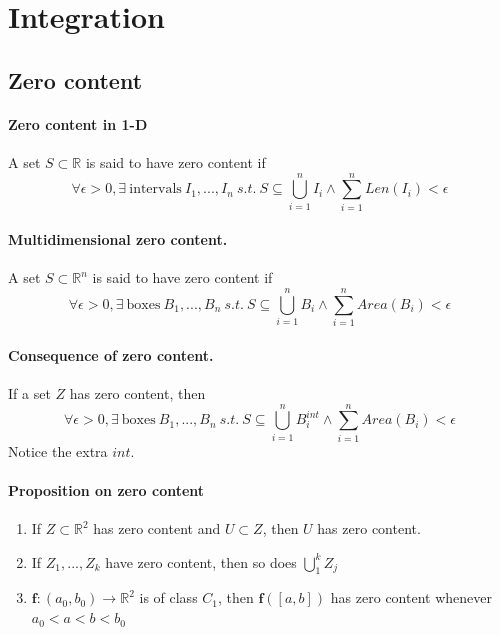 \documentclass[11pt]{article}
\newcommand{\real}[0]{\mathbb{R}}
\begin{document}
\section{Integration}
\subsection{Zero content}
\paragraph{Zero content in 1-D} A set $S\subset \real$ is said to have zero content if
\begin{equation*}
    \forall \epsilon > 0, \exists~\text{intervals}~I_1,...,I_n ~s.t.~ S\subseteq \bigcup_{i=1}^{n}I_i \wedge \sum_{i=1}^{n}{Len(I_i)} < \epsilon
\end{equation*}

\paragraph{Multidimensional zero content.} A set $S\subset \real^n$ is said to have zero content if
\begin{equation*}
    \forall \epsilon > 0, \exists~\text{boxes}~B_1,...,B_n~s.t.~S\subseteq \bigcup_{i=1}^{n}B_i \wedge \sum_{i=1}^{n}{Area(B_i)} < \epsilon
\end{equation*}

\paragraph{Consequence of zero content.}If a set $Z$ has zero content, then
\begin{equation*}
    \forall \epsilon>0, \exists~\text{boxes}~B_1,...,B_n~s.t.~ S\subseteq \bigcup_{i=1}^{n}B^{int}_i \wedge \sum_{i=1}^{n}{Area(B_i)} < \epsilon
\end{equation*}
Notice the extra $int$.

\paragraph{Proposition on zero content} 
\begin{enumerate}
    \item If $Z\subset \real^2$ has zero content and $U\subset Z$, then $U$ has zero content.
    \item If $Z_1,...,Z_k$ have zero content, then so does $\bigcup_1^k Z_j$
    \item $\mathbf{f}:(a_0, b_0) \xrightarrow{} \real^2$ is of class $C_1$, then $\mathbf{f}([a,b])$ has zero content whenever $a_0<a<b<b_0$
\end{enumerate}
\end{document}
